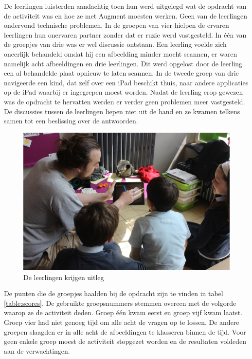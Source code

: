 \documentclass[pdftex,a4paper,12pt,twoside]{report}
\begin{document}
De leerlingen luisterden aandachtig toen hun werd uitgelegd wat de opdracht van de activiteit was en hoe ze met Augment moesten werken. Geen van de leerlingen ondervond technische problemen. In de groepen van vier hielpen de ervaren leerlingen hun onervaren partner zonder dat er ruzie werd vastgesteld. In \'e\'en van de groepjes van drie was er wel discussie ontstaan. Een leerling voelde zich oneerlijk behandeld omdat hij een afbeelding minder mocht scannen, er waren namelijk acht afbeeldingen en drie leerlingen. Dit werd opgelost door de leerling een al behandelde plaat opnieuw te laten scannen. In de tweede groep van drie navigeerde een kind, dat zelf over een iPad beschikt thuis, naar andere applicaties op de iPad waarbij er ingegrepen moest worden. Nadat de leerling erop gewezen was de opdracht te hervatten werden er verder geen problemen meer vastgesteld. De discussies tussen de leerlingen liepen niet uit de hand en ze kwamen telkens samen tot een beslissing over de antwoorden. \\

\begin{figure}
\vspace{-10pt}
\includegraphics[scale=0.1]{klas1}
\caption{De leerlingen krijgen uitleg}
\end{figure}

De punten die de groepjes haalden bij de opdracht zijn te vinden in tabel \ref{table:scores}. De gebruikte groepsnummers stemmen overeen met de volgorde waarop ze de activiteit deden. Groep \'e\'en kwam eerst en groep vijf kwam laatst. Groep vier had niet genoeg tijd om alle acht de vragen op te lossen. De andere groepen slaagden er in alle acht de afbeeldingen te klasseren binnen de tijd. Voor geen enkele groep moest de activiteit stopgezet worden en de resultaten voldeden aan de verwachtingen.\\
\end{document}
